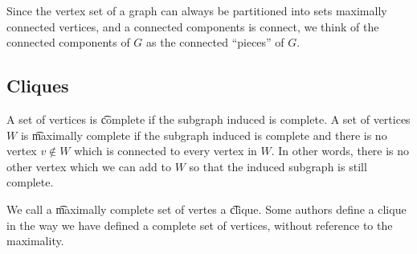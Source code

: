 Since the vertex set of a graph can always be partitioned into sets maximally connected vertices, and a connected components is connect, we think of the connected components of $G$ as the connected ``pieces'' of $G$.

\subsection*{Cliques}

A set of vertices is \t{complete} if the subgraph induced is complete.
A set of vertices $W$ is \t{maximally complete} if the subgraph induced is complete and there is no vertex $v \not\in W$ which is connected to every vertex in $W$.
In other words, there is no other vertex which we can add to $W$ so that the induced subgraph is still complete.

We call a \t{maximally complete} set of vertes a \t{clique}.
Some authors define a clique in the way we have defined a complete set of vertices, without reference to the maximality.

%  
